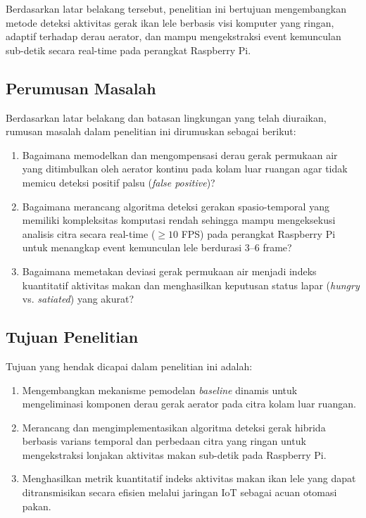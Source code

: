 Berdasarkan latar belakang tersebut, penelitian ini bertujuan mengembangkan metode deteksi aktivitas gerak ikan lele berbasis visi komputer yang ringan, adaptif terhadap derau aerator, dan mampu mengekstraksi event kemunculan sub-detik secara real-time pada perangkat Raspberry Pi.

\subsection{Perumusan Masalah}
Berdasarkan latar belakang dan batasan lingkungan yang telah diuraikan, rumusan masalah dalam penelitian ini dirumuskan sebagai berikut:
\begin{enumerate}
    \item Bagaimana memodelkan dan mengompensasi derau gerak permukaan air yang ditimbulkan oleh aerator kontinu pada kolam luar ruangan agar tidak memicu deteksi positif palsu (\textit{false positive})?
    \item Bagaimana merancang algoritma deteksi gerakan spasio-temporal yang memiliki kompleksitas komputasi rendah sehingga mampu mengeksekusi analisis citra secara real-time ($\ge 10$ FPS) pada perangkat Raspberry Pi untuk menangkap event kemunculan lele berdurasi 3--6 frame?
    \item Bagaimana memetakan deviasi gerak permukaan air menjadi indeks kuantitatif aktivitas makan dan menghasilkan keputusan status lapar (\textit{hungry} vs. \textit{satiated}) yang akurat?
\end{enumerate}

\subsection{Tujuan Penelitian}
Tujuan yang hendak dicapai dalam penelitian ini adalah:
\begin{enumerate}
    \item Mengembangkan mekanisme pemodelan \textit{baseline} dinamis untuk mengeliminasi komponen derau gerak aerator pada citra kolam luar ruangan.
    \item Merancang dan mengimplementasikan algoritma deteksi gerak hibrida berbasis varians temporal dan perbedaan citra yang ringan untuk mengekstraksi lonjakan aktivitas makan sub-detik pada Raspberry Pi.
    \item Menghasilkan metrik kuantitatif indeks aktivitas makan ikan lele yang dapat ditransmisikan secara efisien melalui jaringan IoT sebagai acuan otomasi pakan.
\end{enumerate}

